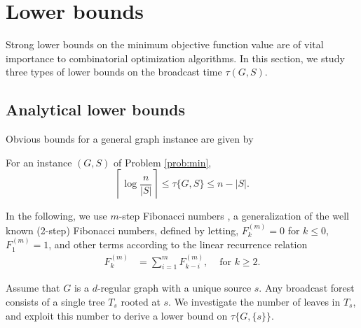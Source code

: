 \section{Lower bounds}
Strong lower bounds on the minimum objective function value are of vital importance to combinatorial optimization algorithms.
In this section, we study three types of lower bounds on the broadcast time $\tau(G,S)$.

\subsection{Analytical lower bounds} \label{sec:lbanalyt}
Obvious bounds for a general graph instance are given by
\begin{observation}
For an instance $(G,S)$ of Problem \ref{prob:min},
\begin{equation}
\left\lceil\log\frac{n}{|S|}\right\rceil\leq \tau\{G,S\} \leq n-|S|.
\label{eq:loglb}
\end{equation}
\label{obs:loglb}
\end{observation}

In the following, we use $m$-step Fibonacci numbers \cite{noe05}, a generalization of the well known (2-step) Fibonacci numbers, defined by letting, 
$F^{(m)}_k=0$ for $k\leq 0$, $F^{(m)}_1=1$, and 
other terms according to the linear recurrence relation 
\begin{align*}
F^{(m)}_k &=\sum\limits_{i=1}^m F^{(m)}_{k-i}, &\text{ for } k\geq 2.
\end{align*}

Assume that $G$ is a $d$-regular graph with a unique source $s$.
Any broadcast forest consists of a single tree $T_s$ rooted at $s$.
We investigate the number of leaves in $T_s$, and exploit this number to derive a lower bound on $\tau\{G,\{s\}\}$.


